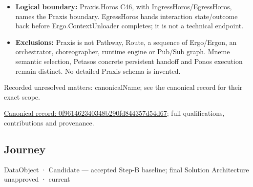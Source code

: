 \begin{itemize}
\item \textbf{Logical boundary:} \href{\detokenize{../../../../../docs/markdown/05-information-systems-architecture/component-register.md#c46}}{Praxis.Horos C46}, with IngressHoros/EgressHoros,
  names the Praxis boundary. EgressHoros hands interaction state/outcome back
  before Ergo.ContextUnloader completes; it is not a technical endpoint.

\item \textbf{Exclusions:} Praxis is not Pathway, Route, a sequence of Ergo/Ergon, an
  orchestrator, choreographer, runtime engine or Pub/Sub graph. Mneme semantic
  selection, Petasos concrete persistent handoff and Ponos execution remain distinct.
  No detailed Praxis schema is invented.

\end{itemize}

{\small Recorded unresolved matters: canonicalName; see the canonical record for their exact scope.}\par
{\footnotesize \href{../../../../continuum/application/data-object/0f961462340348b290fd844357d54d67.md}{Canonical record: 0f961462340348b290fd844357d54d67}; full qualifications, contributions and provenance.}\par
\subsection{Journey}

\label{element:359b901df27f4b43b5a2ff14a8484e34}
{\small DataObject · Candidate — accepted Step-B baseline; final Solution Architecture unapproved · current}\par

